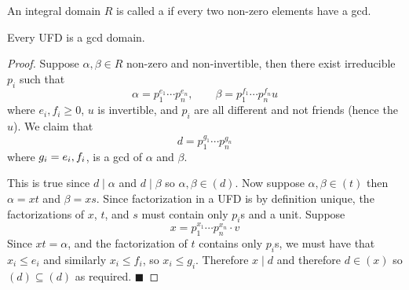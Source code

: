 \documentclass[10pt]{article}
\def\divides{{\mid}}
\def\qed{\hskip1cm\hbox{}\hfill$\blacksquare$}
\begin{document}
\begin{defn*}

    An integral domain $R$ is called a  if every two non-zero elements have a gcd.

\end{defn*}

\begin{prop*}

    Every UFD is a gcd domain.

\end{prop*}

\begin{proof}

    Suppose $\alpha,\beta\in R$ non-zero and non-invertible, then there exist irreducible $p_i$ such that
    \[ \alpha = p_1^{e_1}\cdots p_n^{e_n},\qquad \beta = p_1^{f_1}\cdots p_n^{f_n}u \]
    where $e_i,f_i\geq0$, $u$ is invertible, and $p_i$ are all different and not friends (hence the $u$).
    We claim that
    \[ d = p_1^{g_1}\cdots p_n^{g_n} \]
    where $g_i=\minof{e_i,f_i}$, is a gcd of $\alpha$ and $\beta$.

    This is true since $d\divides\alpha$ and $d\divides\beta$ so $\alpha,\beta\in(d)$.
    Now suppose $\alpha,\beta\in(t)$ then $\alpha=xt$ and $\beta=xs$.
    Since factorization in a UFD is by definition unique, the factorizations of $x$, $t$, and $s$ must contain only $p_i$s and a unit.
    Suppose
    \[ x = p_1^{x_1}\cdots p_n^{x_n}\cdot v \]
    Since $xt=\alpha$, and the factorization of $t$ contains only $p_i$s, we must have that $x_i\leq e_i$ and similarly $x_i\leq f_i$, so $x_i\leq g_i$.
    Therefore $x\divides d$ and therefore $d\in(x)$ so $(d)\subseteq(d)$ as required.
    \qed

\end{proof}
\end{document}
